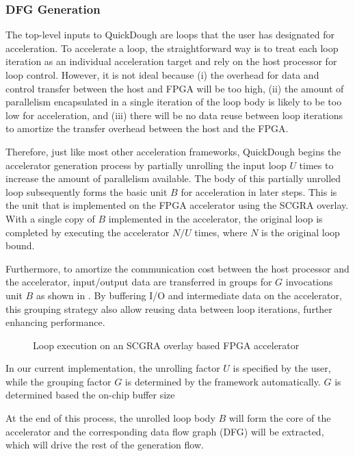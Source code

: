 \subsubsection{DFG Generation}
The top-level inputs to QuickDough are loops that the user has designated for acceleration.
To accelerate a loop, the straightforward way is to treat each loop iteration as an individual acceleration target and rely on the host processor for loop control.
However, it is not ideal because (i) the overhead for data and control transfer between the host and FPGA will be too high, (ii) the amount of parallelism encapsulated in a single iteration of the loop body is likely to be too low for acceleration, and (iii) there will be no data reuse between loop iterations to amortize the transfer overhead between the host and the FPGA.

Therefore, just like most other acceleration frameworks, QuickDough begins the accelerator generation process by partially unrolling the input loop $U$ times to increase the amount of parallelism available.
The body of this partially unrolled loop subsequently forms the basic unit $B$ for acceleration in later steps.
This is the unit that is implemented on the FPGA accelerator using the SCGRA overlay.
With a single copy of $B$ implemented in the accelerator, the original loop is completed by executing the accelerator $N/U$ times, where $N$ is the original loop bound.

Furthermore, to amortize the communication cost between the host processor and the accelerator, input/output data are transferred in groups for $G$ invocations unit $B$ as shown in .
By buffering I/O and intermediate data on the accelerator, this grouping strategy also allow reusing data between loop iterations, further enhancing performance.

\begin{figure}
\caption{Loop execution on an SCGRA overlay based FPGA accelerator}
\label{fig:blocking-and-dfg-gen}
\end{figure}

In our current implementation, the unrolling factor $U$ is specified by the user, while the grouping factor $G$ is determined by the framework automatically.
$G$ is determined based the on-chip buffer size

At the end of this process, the unrolled loop body $B$ will form the core of the accelerator and the corresponding data flow graph (DFG) will be extracted, which will drive the rest of the generation flow.



